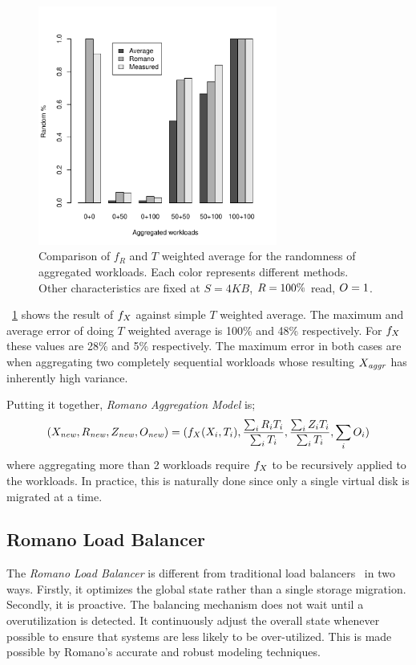\begin{figure}[!t]
\centering
\includegraphics[width=0.7\textwidth]{figure/random_accuracy.pdf}
\caption{Comparison of $f_R$ and $T$ weighted average for the randomness of aggregated workloads.
Each color represents different methods.
Other characteristics are fixed at $S=4\mathit{KB}$, $R=100\%$ read, $O=1$.
}
\label{randmix}
\end{figure}
\figurename~\ref{randmix} shows the result of $f_{X}$ against simple $T$ weighted average.
The maximum and average error of doing $T$ weighted average is 100\% and 48\% respectively.
For $f_{X}$ these values are 28\% and 5\% respectively.
The maximum error in both cases are when aggregating two completely sequential workloads whose resulting ${X}_{\mathit{aggr}}$ has inherently high variance.

Putting it together, \emph{Romano Aggregation Model} is;
\begin{equation}\label{sumFun}
(X_{\mathit{new}}, R_{\mathit{new}}, Z_{\mathit{new}}, O_{\mathit{new}}) \\
  = (f_{X}({X}_i, T_i), \frac{\sum_{i} {R}_i T_i}{\sum_{i} T_i}, \frac{\sum_{i} {Z}_i T_i}{\sum_{i} T_i}, \sum_{i} {O}_i)
\end{equation}
where aggregating more than 2 workloads require $f_{X}$ to be recursively applied to the workloads.
In practice, this is naturally done since only a single virtual disk is migrated at a time.

\subsection{Romano Load Balancer}
The \emph{Romano Load Balancer} is different from traditional load balancers~\cite{gulati:2010, gulati:2011, singh:2008} in two ways.
Firstly, it optimizes the global state rather than a single storage migration.
Secondly, it is proactive.
The balancing mechanism does not wait until a overutilization is detected.
It continuously adjust the overall state whenever possible to ensure that systems are less likely to be over-utilized.
This is made possible by Romano's accurate and robust modeling techniques.

